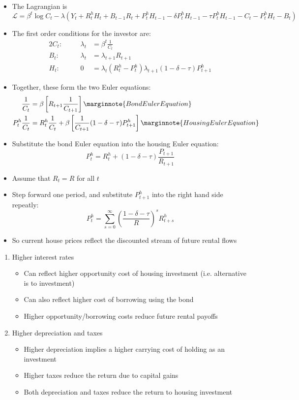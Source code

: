 \documentclass{article}
\numberwithin{equation}{section}
\numberwithin{figure}{section}
\begin{document}
\begin{itemize}
		\item The Lagrangian is
		\[
			\mathcal{L} = \beta^t\log C_t - \lambda(Y_t + R_t^h H_t + B_{t-1}R_t + P_t^h H_{t-1} - \delta P_t^h H_{t-1} - \tau P_t^h H_{t-1}- C_t - P_t^hH_t - B_t)
		\]
		\item The first order conditions for the investor are:
		\begin{alignat*}{2}
			C_t:\quad && \lambda_t&= \beta^t\frac{1}{C_t}\\
			B_t:\quad && \lambda_t&= \lambda_{t+1}R_{t+1}\\
			H_t:\quad && 0&= \lambda_t(R_t^h-P_t^h)\lambda_{t+1}(1-\delta-\tau)P_{t+1}^h
		\end{alignat*}
		\item Together, these form the two Euler equations:
		\begin{align*}{2}
			\frac{1}{C_t} &= \beta\left[R_{t+1} \frac{1}{C_{t+1}} \right] \marginnote{Bond Euler Equation}\\
			P_t^h \frac{1}{C_t} &= R^h_t\frac{1}{C_t} + \beta\left[ \frac{1}{C_{t+1}} (1-\delta-\tau)P_{t+1}^h \right] \marginnote{Housing Euler Equation}
		\end{align*}
		\item Substitute the bond Euler equation into the housing Euler equation:
		\[
			P_t^h = R_t^h + (1-\delta-\tau)\frac{P_{t+1}}{R_{t+1}}
		\]
		\item Assume that \( R_t = R \) for all \( t \)
		\item Step forward one period, and substitute \( P_{t+1}^h \) into the right hand side repeatly:
		\[
			P_t^h = \sum_{s=0}^\infty \left( \frac{1-\delta-\tau}{R}\right)^s R_{t+s}^h
		\]
		\item So current house prices reflect the discounted stream of future rental flows
	\end{itemize}
	\begin{enumerate}[label=\textbf{\arabic*.}]
		\item Higher interest rates
		\begin{itemize}
			\item Can reflect higher opportunity cost of housing investment (i.e. alternative is to investment)
			\item Can also reflect higher cost of borrowing using the bond
			\item Higher opportunity/borrowing costs reduce future rental payoffs
		\end{itemize}
		\item Higher depreciation and taxes
		\begin{itemize}
			\item Higher depreciation implies a higher carrying cost of holding as an investment
			\item Higher taxes reduce the return due to capital gains
			\item Both depreciation and taxes reduce the return to housing investment
		\end{itemize}
	\end{enumerate}
\end{document}
